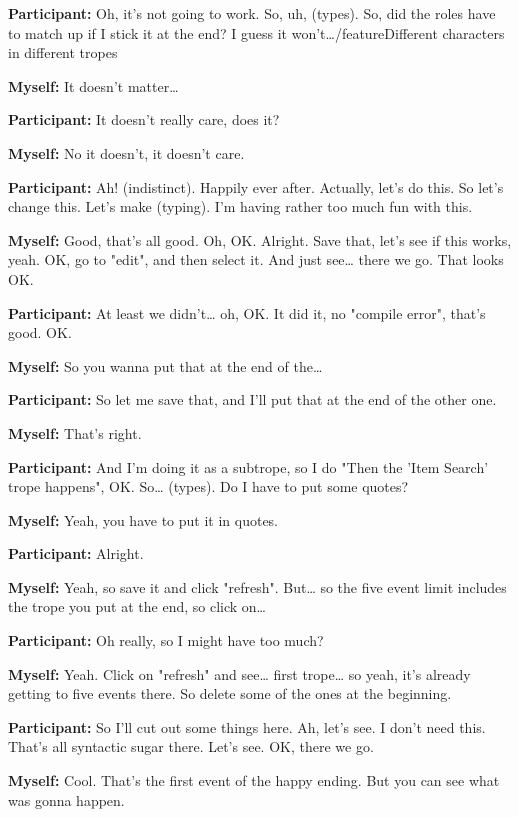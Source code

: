 \documentclass[11pt]{report}
\newcommand{\llabel}[1]{\hypertarget{llineno:#1}{\linelabel{#1}}}
\begin{document}
\begin{linenumbers}
\textbf{Participant:} Oh, it's not going to work. So, uh, (types). So, did the
roles have to match up if I stick it at the end? I guess it
won't\ldots{}/feature{Different characters in different tropes}

\textbf{Myself:} It doesn't matter\ldots{}

\textbf{Participant:} It doesn't really care, does it?

\textbf{Myself:} No it doesn't, it doesn't care.

\textbf{Participant:} Ah! (indistinct). Happily ever after. Actually, let's do this. So let's change this. Let's make (typing). I'm having rather too much fun with this.

\textbf{Myself:} Good, that's all good. Oh, OK. Alright. Save that, let's see if this works, yeah. OK, go to "edit", and then select it. And just see\ldots{} there we go. That looks OK.

\textbf{Participant:} At least we didn't\ldots{} oh, OK. It did it, no "compile error", that's good. OK.

\textbf{Myself:} So you wanna put that at the end of the\ldots{}

\textbf{Participant:} So let me save that, and I'll put that at the end of the other one.

\textbf{Myself:} That's right.

\textbf{Participant:} And I'm doing it as a subtrope, so I do "Then the 'Item Search' trope happens", OK. So\ldots{} (types). Do I have to put some quotes?

\textbf{Myself:} Yeah, you have to put it in quotes.

\textbf{Participant:} Alright.

\textbf{Myself:} Yeah, so save it and click "refresh". But\ldots{} so the five
event limit includes the trope you put at the end, so click on\ldots{}\llabel{lne:bug1g2}

\textbf{Participant:} Oh really, so I might have too much?

\textbf{Myself:} Yeah. Click on "refresh" and see\ldots{} first trope\ldots{} so yeah, it's already getting to five events there. So delete some of the ones at the beginning.

\textbf{Participant:} So I'll cut out some things here. Ah, let's see. I don't need this. That's all syntactic sugar there. Let's see. OK, there we go.

\textbf{Myself:} Cool. That's the first event of the happy ending. But you can see what was gonna happen.


\end{linenumbers}
\end{document}
